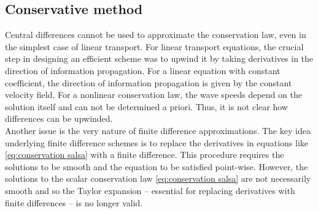 \documentclass[12pt,a4paper]{article}
\numberwithin{equation}{section}
\begin{document}
\subsection{Conservative method}
Central differences cannot be used to approximate the conservation law, even in the simplest case of linear transport. For linear transport equations, the crucial step in designing an efficient scheme was to upwind it by taking derivatives in the direction of information propagation. For a linear equation with constant coefficient, the direction of information propagation is given by the constant velocity field. For a nonlinear conservation law, the wave speeds depend on the solution itself and can not be determined a priori. Thus, it is not
clear how differences can be upwinded.\\
Another issue is the very nature of finite difference approximations. The key idea underlying finite difference schemes is to replace the derivatives in equations like \ref{eq:conservation salsa} with a finite difference. This procedure requires the solutions to be smooth and the equation to be satisfied point-wise. However, the solutions to the scalar conservation law \ref{eq:conservation salsa} are not necessarily smooth and so the Taylor expansion – essential for replacing derivatives with finite differences – is no longer valid.
\end{document}
